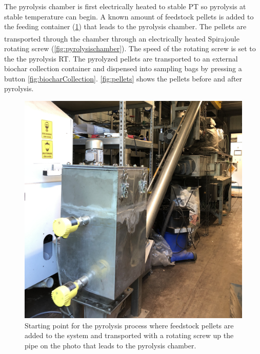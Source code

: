 The pyrolysis chamber is first electrically heated to stable PT so pyrolysis at stable temperature can begin. A known amount of feedstock pellets is added to the feeding container (\cref{fig:feeder})  that leads to the pyrolysis chamber. The pellets are transported through the chamber through an electrically heated Spirajoule\textsuperscript{\textregistered} rotating screw (\cref{fig:pyrolysischamber}). The speed of the rotating screw is set to the the pyrolysis RT. The pyrolyzed pellets are transported to an external biochar collection container and dispensed into sampling bags by pressing a button \cref{fig:biocharCollection}. \cref{fig:pellets} shows the pellets before and after pyrolysis. 

\begin{figure}
    \centering
    \includegraphics[width=0.6\linewidth,scale=0.6]{Bilder/Pyrolysis/Feeder.jpg}
    \caption{Starting point for the pyrolysis process where feedstock pellets are added to the system and transported with a rotating screw up the pipe on the photo that leads to the pyrolysis chamber.}
    \label{fig:feeder}
\end{figure}

